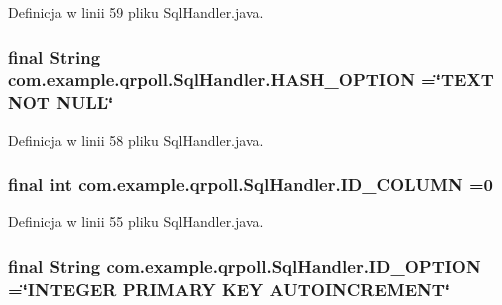 Definicja w linii 59 pliku Sql\+Handler.\+java.

\hypertarget{classcom_1_1example_1_1qrpoll_1_1_sql_handler_a5e06705347d09bc8a2a42b18b7ae2a39}{
\subsubsection[{H\+A\+S\+H\+\_\+\+O\+P\+T\+I\+O\+N}]{\setlength{\rightskip}{0pt plus 5cm}final String com.\+example.\+qrpoll.\+Sql\+Handler.\+H\+A\+S\+H\+\_\+\+O\+P\+T\+I\+O\+N =\char`\"{}T\+E\+X\+T N\+O\+T N\+U\+L\+L\char`\"{}\hspace{0.3cm}{\ttfamily [static]}}}\label{classcom_1_1example_1_1qrpoll_1_1_sql_handler_a5e06705347d09bc8a2a42b18b7ae2a39}


Definicja w linii 58 pliku Sql\+Handler.\+java.

\hypertarget{classcom_1_1example_1_1qrpoll_1_1_sql_handler_a2c504a59b0a9b6b99a26b181fa875460}{
\subsubsection[{I\+D\+\_\+\+C\+O\+L\+U\+M\+N}]{\setlength{\rightskip}{0pt plus 5cm}final int com.\+example.\+qrpoll.\+Sql\+Handler.\+I\+D\+\_\+\+C\+O\+L\+U\+M\+N =0\hspace{0.3cm}{\ttfamily [static]}}}\label{classcom_1_1example_1_1qrpoll_1_1_sql_handler_a2c504a59b0a9b6b99a26b181fa875460}


Definicja w linii 55 pliku Sql\+Handler.\+java.

\hypertarget{classcom_1_1example_1_1qrpoll_1_1_sql_handler_aa5a0c822d90c20141ddadf6a396c332f}{
\subsubsection[{I\+D\+\_\+\+O\+P\+T\+I\+O\+N}]{\setlength{\rightskip}{0pt plus 5cm}final String com.\+example.\+qrpoll.\+Sql\+Handler.\+I\+D\+\_\+\+O\+P\+T\+I\+O\+N =\char`\"{}I\+N\+T\+E\+G\+E\+R P\+R\+I\+M\+A\+R\+Y K\+E\+Y A\+U\+T\+O\+I\+N\+C\+R\+E\+M\+E\+N\+T\char`\"{}\hspace{0.3cm}{\ttfamily [static]}}}\label{classcom_1_1example_1_1qrpoll_1_1_sql_handler_aa5a0c822d90c20141ddadf6a396c332f}


